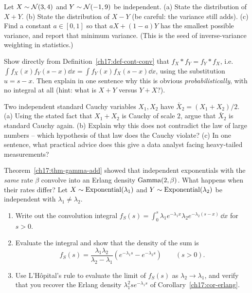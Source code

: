 \begin{exercise}
\label{ch17:ex-normal}
Let $X\sim\mathcal{N}(3,4)$ and $Y\sim\mathcal{N}(-1,9)$ be independent.
(a) State the distribution of $X+Y$.
(b) State the distribution of $X-Y$ (be careful: the variance still adds).
(c) Find a constant $a\in[0,1]$ so that $aX+(1-a)Y$ has the smallest
possible variance, and report that minimum variance. (This is the seed of
inverse-variance weighting in statistics.)
\end{exercise}

\begin{exercise}
\label{ch17:ex-commute}
Show directly from Definition~\ref{ch17:def-cont-conv} that
$f_X*f_Y=f_Y*f_X$, i.e.\ $\int f_X(x)f_Y(s-x)\dd x=\int f_Y(x)f_X(s-x)\dd x$,
using the substitution $u=s-x$. Then explain in one sentence why this is
obvious \emph{probabilistically}, with no integral at all (hint: what is
$X+Y$ versus $Y+X$?).
\end{exercise}

\begin{exercise}
\label{ch17:ex-cauchy}
Two independent standard Cauchy variables $X_1,X_2$ have
$\bar X_2=(X_1+X_2)/2$.
(a) Using the stated fact that $X_1+X_2$ is Cauchy of scale $2$, argue that
$\bar X_2$ is standard Cauchy again.
(b) Explain why this does not contradict the law of large numbers --
which hypothesis of that law does the Cauchy violate?
(c) In one sentence, what practical advice does this give a data analyst
facing heavy-tailed measurements?
\end{exercise}

\begin{exercise}
\label{ch17:ex-expo-diff}
Theorem~\ref{ch17:thm-gamma-add} showed that independent exponentials with
the \emph{same} rate $\beta$ convolve into an Erlang density $\operatorname{Gamma}(2,\beta)$.
What happens when their rates differ? Let $X \sim \operatorname{Exponential}(\lambda_1)$ and
$Y \sim \operatorname{Exponential}(\lambda_2)$ be independent with $\lambda_1 \ne \lambda_2$.
\begin{enumerate}[label=(\alph*)]
  \item Write out the convolution integral
        $f_S(s) = \int_0^s \lambda_1 e^{-\lambda_1 x} \lambda_2 e^{-\lambda_2(s-x)}\,\dd x$
        for $s > 0$.
  \item Evaluate the integral and show that the density of the sum is
        \[
        f_S(s) = \frac{\lambda_1 \lambda_2}{\lambda_2 - \lambda_1}
                 \left( e^{-\lambda_1 s} - e^{-\lambda_2 s} \right)
        \qquad (s > 0).
        \]
  \item Use L'H\^opital's rule to evaluate the limit of $f_S(s)$ as
        $\lambda_2 \to \lambda_1$, and verify that you recover the Erlang
        density $\lambda_1^2 s e^{-\lambda_1 s}$ of
        Corollary~\ref{ch17:cor-erlang}.
\end{enumerate}
\end{exercise}

